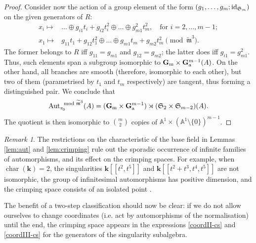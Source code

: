 \documentclass{compositio}
\renewcommand{\k}{\mathbf k}
\newcommand{\tm}{\widetilde{\mathfrak m}}
\newcommand{\Aaff}{\mathbb A}
\newcommand{\Gm}{\mathbb{G}_{\rm{m}}}
\newcommand{\Ga}{\mathbb{G}_{\rm{a}}}
\newcommand{\Aut}{\operatorname{Aut}}
\newcommand{\id}{{\rm id}}
\theoremstyle{plain}
\theoremstyle{definition}
\theoremstyle{remark}
\newtheorem{rem}[thm]{Remark}
\begin{document}
\begin{proof}
Consider now the action of a group element of the form $(g_1,\ldots,g_m;\id_{\mathfrak{S}_m})$ on the given generators of $R$:
\begin{align*}
 x_i\mapsto& \ldots\oplus g_{i1}t_i+g_{i2}t_i^2\oplus\ldots\oplus g_{m1}^2t_m^2,\quad\text{for } i=2,\ldots,m-1;\\
 x_1\mapsto& g_{11}t_1+g_{12}t_1^2\oplus\ldots\oplus g_{m1}t_m+g_{m2}t_m^2 \pmod{\tm^3}.
\end{align*}
The former belongs to $R$ iff $g_{11}=g_{m1}$ and $g_{12}=g_{m2}$; the latter does iff $g_{i1}=g_{m1}^2$. Thus, such elements span a subgroup isomorphic to $\Gm\times\Ga^{m-1}(A)$. On the other hand, all branches are smooth (therefore, isomorphic to each other), but two of them (parametrised by $t_1$ and $t_m$ respectively) are tangent, thus forming a distinguished pair. We conclude that
\[\Aut_{\tau_0}^{\mod\tm^3}(A)=(\Gm\times\Ga^{m-1})\rtimes(\mathfrak{S}_2\times\mathfrak{S}_{m-2})(A).\]
The quotient is then isomorphic to $\binom{m}{2}$ copies of $\Aaff^1\times(\Aaff^1\setminus\{0\})^{m-1}$.
\end{proof}


\begin{rem}\label{rem:characteristic}
 The restrictions on the characteristic of the base field in Lemmas \ref{lem:aut} and \ref{lem:crimping} rule out the sporadic occurrence of infinite families of automorphisms, and its effect on the crimping spaces. For example, when $\operatorname{char}(\k)=2$, the singularities $\k[\![t^2,t^5]\!]$ and $\k[\![t^2+t^3,t^4,t^5]\!]$ are not isomorphic, the group of infinitesimal automorphisms has positive dimension, and the crimping space consists of an isolated point \cite[Examples 1.79-80]{vdW}.
\end{rem}

The benefit of a two-step classification should now be clear: if we do not allow ourselves to change coordinates (i.e. act by automorphisms of the normalisation) until the end, the crimping space appears in the expressions \eqref{coordII-cs} and \eqref{coordIII-cs} for the generators of the singularity subalgebra.
\end{document}
